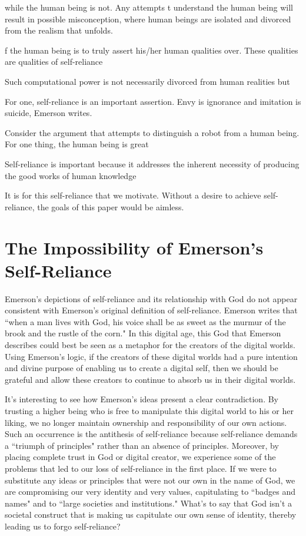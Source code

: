 \documentclass[12pt,letterpaper]{article}
\begin{document}
while the human being is not.  Any attempts t understand the human being will result in possible misconception, where human beings are isolated and divorced from the realism that unfolds.

f the human being is to truly assert his/her human qualities over.  These qualities are qualities of self-reliance

Such computational power is not necessarily divorced from human realities but

For one, self-reliance is an important assertion.  Envy is ignorance and imitation is suicide, Emerson writes.  

Consider the argument that attempts to distinguish a robot from a human being.  For one thing, the human being is great

Self-reliance is important because it addresses the inherent necessity of producing the good works of human knowledge  

It is for this self-reliance that we motivate.  Without a desire to achieve self-reliance, the goals of this paper would be aimless.
\fi

\section{The Impossibility of Emerson's Self-Reliance}

Emerson's depictions of self-reliance and its relationship with God do not appear consistent with Emerson's original definition of self-reliance.  Emerson writes that ``when a man lives with God, his voice shall be as sweet as the murmur of the brook and the rustle of the corn."  In this digital age, this God that Emerson describes could best be seen as a metaphor for the creators of the digital worlds.  Using Emerson's logic, if the creators of these digital worlds had a pure intention and divine purpose of enabling us to create a digital self, then we should be grateful and allow these creators to continue to absorb us in their digital worlds.

It's interesting to see how Emerson's ideas present a clear contradiction.  By trusting a higher being who is free to manipulate this digital world to his or her liking, we no longer maintain ownership and responsibility of our own actions.  Such an occurrence is the antithesis of self-reliance because self-reliance demands a ``triumph of principles" rather than an absence of principles.  Moreover, by placing complete trust in God or digital creator, we experience some of the problems that led to our loss of self-reliance in the first place.  If we were to substitute any ideas or principles that were not our own in the name of God, we are compromising our very identity and very values, capitulating to ``badges and names" and to ``large societies and institutions."  What's to say that God isn't a societal construct that is making us capitulate our own sense of identity, thereby leading us to forgo self-reliance?
\end{document}

